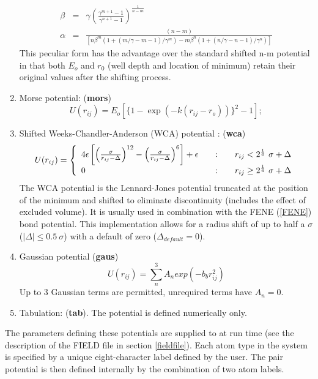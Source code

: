 \begin{enumerate}
\begin{eqnarray}
\beta &=& \gamma\left ( \frac{\gamma^{m+1}-1}{\gamma^{n+1}-1} \right )
^{\frac{1}{n-m}} \\
\alpha&=&\frac{(n-m)}{[n\beta^{m}(1+(m/\gamma-m-1)/\gamma^{m})-
m\beta^{n}(1+(n/\gamma-n-1)/\gamma^{n})]}
\end{eqnarray}
This peculiar form has the advantage over the standard shifted n-m
potential in that both $E_{o}$ and $r_{0}$ (well depth and location of
minimum) retain their original values after the shifting process.
\item Morse potential:  ({\bf mors})
\begin{equation}
U(r_{ij})=E_{o}[\{1-\exp(-k(r_{ij}-r_{o}))\}^{2}-1];
\end{equation}
\item Shifted Weeks-Chandler-Anderson (WCA) potential \cite{weeks-71}:  ({\bf wca})
\begin{equation}
U(r_{ij}) = \left\{ \begin{array} {l@{\qquad:\qquad}l}
4\epsilon\left[\left(\frac{\sigma}{r_{ij}-\Delta}\right)^{12}-\left(\frac{\sigma}{r_{ij}-\Delta}\right)^{6}\right]
+\epsilon & r_{ij} < 2^{1 \over 6}~\sigma + \Delta \\
0 & r_{ij} \ge 2^{1 \over 6}~\sigma + \Delta \end{array} \right. \label{wca}
\end{equation}
The WCA potential is the Lennard-Jones potential truncated at the
position of the minimum and shifted to eliminate discontinuity
(includes the effect of excluded volume).  It is usually used in
combination with the FENE (\ref{FENE}) bond potential.  This
implementation allows for a radius shift of up to half a $\sigma$
($|\Delta| \le 0.5~\sigma$) with a default of zero
($\Delta_{default} = 0$).

\item Gaussian potential ({\bf gaus})
\begin{equation}
U(r_{ij}) = \sum_{n}^{3} A_{n}exp(-b_{b}r_{ij}^{2})
\end{equation}
Up to 3 Gaussian terms are permitted, unrequired terms have $A_{n}=0$.

\item Tabulation: ({\bf tab}). The potential is defined numerically only.
\end{enumerate}

The parameters defining these potentials are supplied to
\D{} at run time (see the description of the FIELD file in section
\ref{fieldfile}). Each atom type in the system is specified by a unique
eight-character label defined by the user. The pair potential is then
defined internally by the combination of two atom labels.

